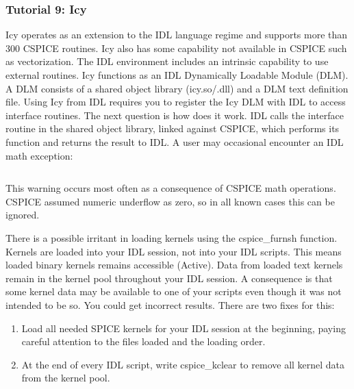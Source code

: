\documentclass[crop=false,class=article,oneside]{standalone}
\begin{document}
            \subsubsection{Tutorial 9: Icy}
            Icy operates as an extension to the IDL language regime and supports more than 300 CSPICE routines. Icy also has some capability not available in CSPICE such as vectorization. The IDL environment includes an intrinsic capability to use external routines. Icy functions as an IDL Dynamically Loadable Module (DLM). A DLM consists of a shared object library (icy.so/.dll) and a DLM text definition file. Using Icy from IDL requires you to register the Icy DLM with IDL to access interface routines. The next question is how does it work. IDL calls the interface routine in the shared object library, linked against CSPICE, which performs its function and returns the result to IDL. A user may occasional encounter an IDL math exception:
            \begin{lstlisting}[language=bash,basicstyle=\footnotesize]
            % Program caused arithmetic error: Floating underflow
            \end{lstlisting}
            This warning occurs most often as a consequence of CSPICE math operations. CSPICE assumed numeric underflow as zero, so in all known cases this can be ignored.
            \begin{remark}
            There is a possible irritant in loading kernels using the cspice\_furnsh function. Kernels are loaded into your IDL session, not into your IDL scripts. This means loaded binary kernels remains accessible (Active). Data from loaded text kernels remain in the kernel pool throughout your IDL session. A consequence is that some kernel data may be available to one of your scripts even though it was not intended to be so. You could get incorrect results. There are two fixes for this:
            \begin{enumerate}
                \item Load all needed SPICE kernels for your IDL session at the beginning, paying careful attention to the files loaded and the loading order.
                \item At the end of every IDL script, write cspice\_kclear to remove all kernel data from the kernel pool.
            \end{enumerate}
            \end{remark}
\end{document}
